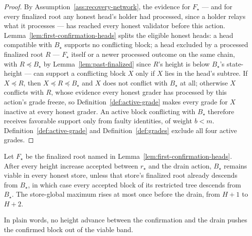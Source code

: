 \begin{proof}
By Assumption~\ref{ass:recovery-network}, the evidence for \(F_\star\) ---
and for every finalized root any honest head's holder had processed,
since a holder relays what it processes --- has
reached every honest validator before this action.
Lemma~\ref{lem:first-confirmation-heads} splits the eligible honest
heads: a head compatible with \(B_\star\) supports no conflicting
block; a head excluded by a processed finalized root \(R\) ---
\(F_\star\) itself or a newer processed outcome on the same chain, with
\(R\preceq B_\star\) by Lemma~\ref{lem:past-finalized} since \(R\)'s
height is below \(B_\star\)'s state-height --- can support a
conflicting block \(X\) only if \(X\) lies in the head's subtree.  If
\(X\preceq R\), then \(X\preceq R\preceq B_\star\) and \(X\) does not
conflict with \(B_\star\) at all; otherwise \(X\) conflicts with
\(R\), whose evidence every honest grader has processed by this
action's grade freeze, so Definition~\ref{def:active-grade} makes every
grade for \(X\) inactive at every honest grader.  An active block
conflicting with \(B_\star\) therefore receives favorable support only
from faulty
identities, of weight \(b<m\).  Definition~\ref{def:active-grade} and
Definition~\ref{def:grades} exclude all four active grades.
\end{proof}

\begin{lemma}
\label{lem:predrain-height-retention}
Let \(F_\star\) be the finalized root named in
Lemma~\ref{lem:first-confirmation-heads}.  After every height increase
accepted between \(r_\star\) and the drain action, \(B_\star\)
remains viable in every honest store, unless that store's finalized root
already descends from \(B_\star\), in which case every accepted block
of its restricted tree descends from \(B_\star\).  The store-global
maximum rises at most once before the drain, from \(H+1\) to
\(H+2\).

In plain words, no height advance between the confirmation and the drain
pushes the confirmed block out of the viable band.
\end{lemma}

